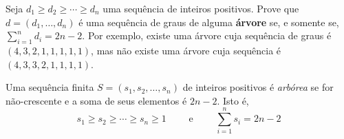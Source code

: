 Seja $d_1 \geq d_2 \geq \cdots \geq d_n$ uma sequência de inteiros positivos. Prove que $d = (d_1, \ldots, d_n)$ é uma sequência de graus de alguma \textbf{árvore} se, e somente se, $\sum_{i=1}^n d_i = 2n - 2$. Por exemplo, existe uma árvore cuja sequência de graus é $(4,3,2,1,1,1,1,1)$, mas não existe uma árvore cuja sequência é $(4,3,3,2,1,1,1,1)$.

\itemdsep

\begin{definition}
    Uma sequência finita $S = (s_1, s_2, \ldots, s_n)$ de inteiros positivos é \textit{arbórea} se for não-crescente e a soma de seus elementos é $2n - 2$. Isto é,
    \[
        s_1 \geq s_2 \geq \cdots \geq s_n \geq 1
        \qquad \text{ e } \qquad
        \sum_{i = 1}^n s_i = 2 n - 2
    \]
\end{definition}





